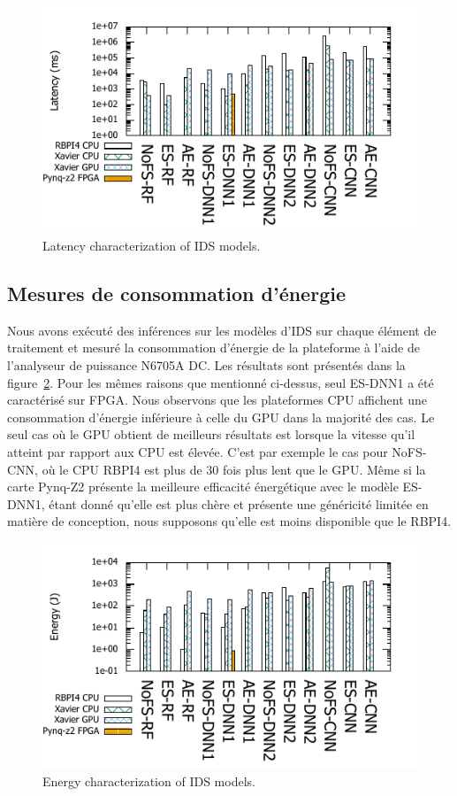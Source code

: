 \begin{figure}
    \centering
    \includegraphics[width=0.9\columnwidth]{5_Chapitre5/figures/latency_bar.pdf}
    \caption{Latency characterization of IDS models.}
    \label{figure:herocache-performance}
\end{figure}

\subsection{Mesures de consommation d'énergie}

Nous avons exécuté des inférences sur les modèles d'IDS sur chaque élément de traitement et mesuré la consommation d'énergie de la plateforme à l'aide de l'analyseur de puissance N6705A DC. Les résultats sont présentés dans la figure~\ref{figure:herocache-energy}. Pour les mêmes raisons que mentionné ci-dessus, seul ES-DNN1 a été caractérisé sur FPGA. Nous observons que les plateformes CPU affichent une consommation d'énergie inférieure à celle du GPU dans la majorité des cas. Le seul cas où le GPU obtient de meilleurs résultats est lorsque la vitesse qu'il atteint par rapport aux CPU est élevée. C'est par exemple le cas pour NoFS-CNN, où le CPU RBPI4 est plus de 30 fois plus lent que le GPU. Même si la carte Pynq-Z2 présente la meilleure efficacité énergétique avec le modèle ES-DNN1, étant donné qu'elle est plus chère et présente une généricité limitée en matière de conception, nous supposons qu'elle est moins disponible que le RBPI4.

\begin{figure}
    \centering
    \includegraphics[width=0.9\columnwidth]{5_Chapitre5/figures/energy_bar.pdf}
    \caption{Energy characterization of IDS models.}
    \label{figure:herocache-energy}
\end{figure}

